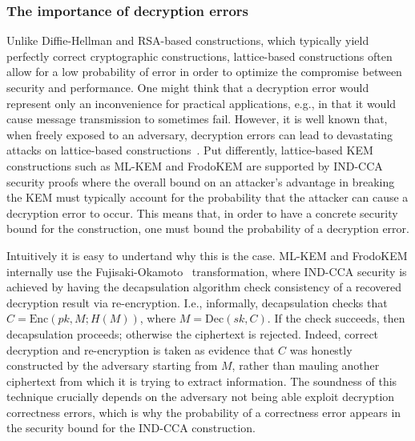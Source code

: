 \documentclass[conference,compsoc]{IEEEtran}
\begin{document}
\subsubsection*{The importance of decryption errors}
Unlike Diffie-Hellman and RSA-based constructions, which typically yield perfectly correct cryptographic constructions, lattice-based constructions often allow for a low probability of error in order to optimize the compromise between security and performance. 
One might think that a decryption error would represent only an inconvenience for practical applications, e.g., in that it would cause message transmission to sometimes fail.
However, it is well known that, when freely exposed to an adversary, decryption errors can lead to devastating attacks on lattice-based constructions~\cite{PKC:DAnBat22,PQCRYPTO:BinSch20,PKC:DGJNVV19b}. 
Put differently, lattice-based KEM  constructions such as ML-KEM and FrodoKEM are supported by IND-CCA security proofs where the overall bound on an attacker's advantage in breaking the KEM must typically account for the probability that the attacker can cause a decryption error to occur. This means that, in order to have a concrete security bound for the construction, one must bound the probability of a decryption error. 

Intuitively it is easy to undertand why this is the case. ML-KEM and FrodoKEM internally use the Fujisaki-Okamoto~\cite{} transformation, where IND-CCA security is achieved by having the decapsulation algorithm check consistency of a recovered decryption result via re-encryption. I.e., informally, decapsulation checks that $C = \mathrm{Enc}(pk,M;H(M))$, where $M = \mathrm{Dec}(sk,C)$. 
If the check succeeds, then decapsulation proceeds; otherwise the ciphertext is rejected.
Indeed, correct decryption and re-encryption is taken as evidence that $C$ was honestly constructed by the adversary starting from $M$, rather than mauling another ciphertext from which it is trying to extract information.
The soundness of this technique crucially depends on the adversary not being able exploit decryption correctness errors, which is why the probability of a correctness error appears in the security bound for the IND-CCA construction.
\end{document}
